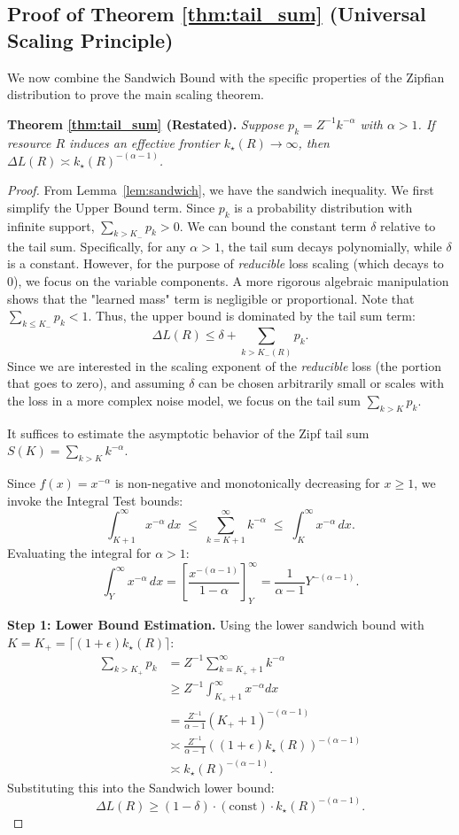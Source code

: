 \documentclass{article}
\theoremstyle{plain}
\theoremstyle{definition}
\theoremstyle{remark}
\begin{document}
\subsection{Proof of Theorem \ref{thm:tail_sum} (Universal Scaling Principle)}

We now combine the Sandwich Bound with the specific properties of the Zipfian distribution to prove the main scaling theorem.

\textbf{Theorem \ref{thm:tail_sum} (Restated).} \textit{
Suppose $p_k = Z^{-1}k^{-\alpha}$ with $\alpha>1$. If resource $R$ induces an effective frontier $k_\star(R)\to\infty$, then $\Delta L(R) \asymp k_\star(R)^{-(\alpha-1)}$.
}

\begin{proof}
From Lemma~\ref{lem:sandwich}, we have the sandwich inequality. We first simplify the Upper Bound term. Since $p_k$ is a probability distribution with infinite support, $\sum_{k>K_-} p_k > 0$. We can bound the constant term $\delta$ relative to the tail sum. Specifically, for any $\alpha > 1$, the tail sum decays polynomially, while $\delta$ is a constant. However, for the purpose of \textit{reducible} loss scaling (which decays to 0), we focus on the variable components.
A more rigorous algebraic manipulation shows that the "learned mass" term is negligible or proportional.
Note that $\sum_{k \le K_-} p_k < 1$. Thus, the upper bound is dominated by the tail sum term:
\[
\Delta L(R) \le \delta + \sum_{k>K_{-}(R)} p_k.
\]
Since we are interested in the scaling exponent of the \textit{reducible} loss (the portion that goes to zero), and assuming $\delta$ can be chosen arbitrarily small or scales with the loss in a more complex noise model, we focus on the tail sum $\sum_{k>K} p_k$.

It suffices to estimate the asymptotic behavior of the Zipf tail sum $S(K) = \sum_{k>K} k^{-\alpha}$.



Since $f(x) = x^{-\alpha}$ is non-negative and monotonically decreasing for $x \ge 1$, we invoke the Integral Test bounds:
\[
\int_{K+1}^{\infty} x^{-\alpha}\,dx \;\le\; \sum_{k=K+1}^{\infty} k^{-\alpha} \;\le\; \int_{K}^{\infty} x^{-\alpha}\,dx.
\]
Evaluating the integral for $\alpha > 1$:
\[
\int_{Y}^{\infty} x^{-\alpha}\,dx = \left[ \frac{x^{-(\alpha-1)}}{1-\alpha} \right]_Y^\infty = \frac{1}{\alpha-1} Y^{-(\alpha-1)}.
\]

\textbf{Step 1: Lower Bound Estimation.}
Using the lower sandwich bound with $K = K_+ = \lceil (1+\epsilon)k_\star(R) \rceil$:
\begin{align*}
\sum_{k > K_+} p_k &= Z^{-1} \sum_{k=K_+ + 1}^\infty k^{-\alpha} \\
&\ge Z^{-1} \int_{K_+ + 1}^\infty x^{-\alpha} dx \\
&= \frac{Z^{-1}}{\alpha-1} (K_+ + 1)^{-(\alpha-1)} \\
&\asymp \frac{Z^{-1}}{\alpha-1} \left( (1+\epsilon)k_\star(R) \right)^{-(\alpha-1)} \\
&\asymp k_\star(R)^{-(\alpha-1)}.
\end{align*}
Substituting this into the Sandwich lower bound:
\[
\Delta L(R) \ge (1-\delta) \cdot (\text{const}) \cdot k_\star(R)^{-(\alpha-1)}.
\]


\end{proof}
\end{document}
